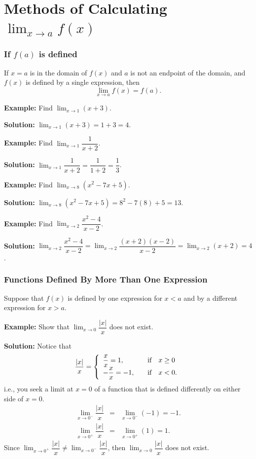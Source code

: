 \documentclass[titlepage,a4paper,12pt]{report}
\begin{document}
\section{Methods of Calculating $\displaystyle \lim _{x\rightarrow a} f(x)$}
\subsubsection{If $f(a)$ is defined}
If $x=a$ is in the domain of $f(x)$ and $a$ is not an endpoint of the domain, and $f(x)$ is defined by a single expression, then 
\begin{equation*}
\lim _{x\rightarrow a} f(x)= f(a).
\end{equation*}

\noindent \textbf{Example:} Find $\displaystyle \lim _{x\rightarrow 1} (x+3)$.

\noindent \textbf{Solution:} $\displaystyle \lim _{x\rightarrow 1}(x+3)=1+3=4$.

\noindent \textbf{Example:} Find $\displaystyle \lim _{x\rightarrow 1} \dfrac{1}{x+2}$.

\noindent \textbf{Solution:} $\displaystyle \lim _{x\rightarrow 1} \dfrac{1}{x+2} =\dfrac{1}{1+2}=\dfrac{1}{3}$.

\noindent \textbf{Example:} Find $\displaystyle \lim _{x\rightarrow 8} (x^2-7x+5)$.

\noindent \textbf{Solution:} $\displaystyle \lim _{x\rightarrow 8} (x^2-7x+5)=8^2-7(8)+5=13$.

\noindent \textbf{Example:} Find $\displaystyle \lim _{x\rightarrow 2} \dfrac{x^2-4}{x-2}$.

\noindent \textbf{Solution:}  $\displaystyle \lim _{x\rightarrow 2} \dfrac{x^2-4}{x-2}= \lim _{x\rightarrow 2} \dfrac{(x+2)(x-2)}{x-2}=\lim _{x\rightarrow 2} (x+2)=4$.

\subsubsection{Functions Defined By More Than One Expression}
Suppose that $f(x)$ is defined by one expression for $x<a$ and by a different expression for $x>a$.

\noindent \textbf{Example:} Show that $\displaystyle \lim _{x\rightarrow 0}\dfrac{|x|}{x}$ does not exist.

\noindent \textbf{Solution:} Notice that 
\[\dfrac{|x|}{x} = \left\{ 
\begin{array}{l l}
  \dfrac{x}{x}=1, & \quad \hbox{if}~~~ x\geq 0 \\
 -\dfrac{x}{x}=-1, & \quad \hbox{if}~~~ x<0.\\ \end{array} \right. \]
 i.e., you seek a limit at $x=0$ of a function that is defined differently on either side of $x=0$.
 \begin{eqnarray*}
 \lim _{x\rightarrow 0^-}\dfrac{|x|}{x} &=& \lim _{x\rightarrow 0^-}(-1)=-1.\\
  \lim _{x\rightarrow 0^+}\dfrac{|x|}{x} &=& \lim _{x\rightarrow 0^+}(1)=1.
 \end{eqnarray*}
 Since $\displaystyle \lim _{x\rightarrow 0^+}\dfrac{|x|}{x} \neq  \lim _{x\rightarrow 0^-}\dfrac{|x|}{x}$, then $\displaystyle  \lim _{x\rightarrow 0}\dfrac{|x|}{x}$ does not exist.
 
\end{document}

